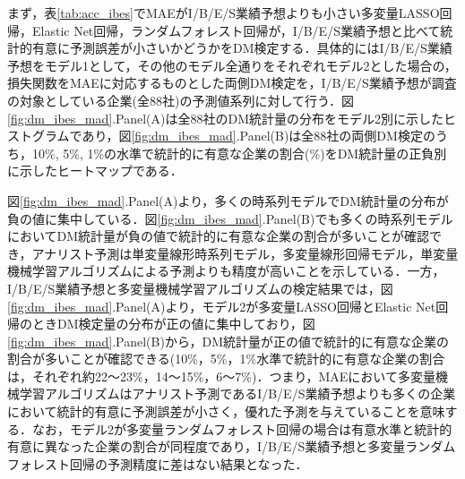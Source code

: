 \documentclass[a4paper，11pt]{jsarticle}
\begin{document}
まず，表\ref{tab:acc_ibes}でMAEがI/B/E/S業績予想よりも小さい多変量LASSO回帰，Elastic Net回帰，ランダムフォレスト回帰が，I/B/E/S業績予想と比べて統計的有意に予測誤差が小さいかどうかをDM検定する．具体的にはI/B/E/S業績予想をモデル1として，その他のモデル全通りをそれぞれモデル2とした場合の，損失関数をMAEに対応するものとした両側DM検定を，I/B/E/S業績予想が調査の対象としている企業(全88社)の予測値系列に対して行う．図\ref{fig:dm_ibes_mad}.Panel(A)は全88社のDM統計量の分布をモデル2別に示したヒストグラムであり，図\ref{fig:dm_ibes_mad}.Panel(B)は全88社の両側DM検定のうち，10\%, 5\%, 1\%の水準で統計的に有意な企業の割合(\%)をDM統計量の正負別に示したヒートマップである．

図\ref{fig:dm_ibes_mad}.Panel(A)より，多くの時系列モデルでDM統計量の分布が負の値に集中している．図\ref{fig:dm_ibes_mad}.Panel(B)でも多くの時系列モデルにおいてDM統計量が負の値で統計的に有意な企業の割合が多いことが確認でき，アナリスト予測は単変量線形時系列モデル，多変量線形回帰モデル，単変量機械学習アルゴリズムによる予測よりも精度が高いことを示している．一方，I/B/E/S業績予想と多変量機械学習アルゴリズムの検定結果では，図\ref{fig:dm_ibes_mad}.Panel(A)より，モデル2が多変量LASSO回帰とElastic Net回帰のときDM検定量の分布が正の値に集中しており，図\ref{fig:dm_ibes_mad}.Panel(B)から，DM統計量が正の値で統計的に有意な企業の割合が多いことが確認できる(10\%，5\%，1\%水準で統計的に有意な企業の割合は，それぞれ約22～23\%，14～15\%，6～7\%)．つまり，MAEにおいて多変量機械学習アルゴリズムはアナリスト予測であるI/B/E/S業績予想よりも多くの企業において統計的有意に予測誤差が小さく，優れた予測を与えていることを意味する．なお，モデル2が多変量ランダムフォレスト回帰の場合は有意水準と統計的有意に異なった企業の割合が同程度であり，I/B/E/S業績予想と多変量ランダムフォレスト回帰の予測精度に差はない結果となった．
\end{document}
